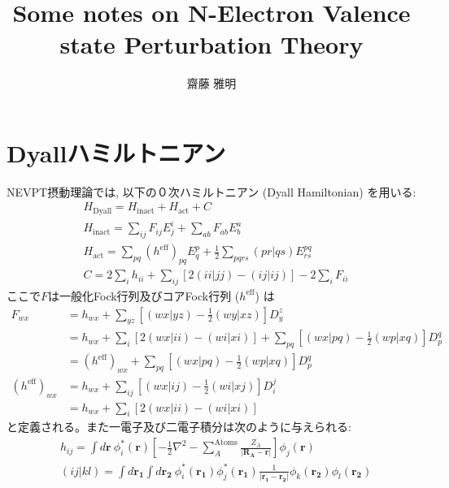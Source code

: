 \documentclass[11pt,pra,aps]{revtex4}
\begin{document}
\title{Some notes on N-Electron Valence state Perturbation Theory}
\author{齋藤 雅明}

\maketitle

\section{Dyallハミルトニアン}

NEVPT摂動理論\cite{angeliintroduction2001,angelin-electron2002,angelinew2006,angelithird-order2006}では, 以下の０次ハミルトニアン (Dyall Hamiltonian) \cite{dyallthe1995}を用いる:
%
\begin{align}
  & H_\text{Dyall} = H_\text{inact} + H_\text{act} + C \label{eq:Dyall}\\
  & H_\text{inact} = \sum_{ij} F_{ij} E^i_j + \sum_{ab} F_{ab} E^a_b \\ 
  & H_\text{act}   = \sum_{pq} (h^\text{eff})_{pq}E^p_q + \frac{1}{2}\sum_{pqrs} (pr|qs) E^{pq}_{rs} \\ 
  & C = 2\sum_i h_{ii} + \sum_{ij} [2(ii|jj)-(ij|ij)] - 2\sum_i F_{ii}\label{eq:C}
\end{align}
%
ここで$F$は一般化Fock行列及びコアFock行列 ($h^\text{eff}$) は
\begin{align}
  F_{wx} &= h_{wx} + \sum_{yz} \left[ (wx|yz) - \frac{1}{2}(wy|xz)\right] D_y^z \nonumber \\
         &= h_{wx} + \sum_{i} \left[2(wx|ii) - (wi|xi)\right] + \sum_{pq} \left[(wx|pq)-\frac{1}{2}(wp|xq)\right] D_p^q \nonumber \\
         &= (h^\text{eff})_{wx} + \sum_{pq} \left[(wx|pq)-\frac{1}{2}(wp|xq)\right] D_p^q \label{eq:genFock} \\
  (h^\text{eff})_{wx} &= h_{wx} + \sum_{ij} \left[ (wx|ij) - \frac{1}{2}(wi|xj)\right] D_i^j \nonumber \\
                      &= h_{wx} + \sum_{i} \left[2(wx|ii) - (wi|xi)\right] \label{eq:heff}
\end{align}
と定義される。また一電子及び二電子積分は次のように与えられる:
%
\begin{align}
  & h_{ij} = \int d\mathbf{r} \ \phi^{*}_i (\mathbf{r})\left[-\frac{1}{2}\nabla^{2}-\sum_A^\text{Atoms} \frac{Z_A}{|\mathbf{R_A}-\mathbf{r}|}\right]\phi_j(\mathbf{r}) \\
  & (ij|kl) = \int d\mathbf{r_1} \int d\mathbf{r_2} \ \phi^{*}_i (\mathbf{r_1}) \phi^{*}_j (\mathbf{r_1}) \frac{1}{|\mathbf{r_1}-\mathbf{r_2}|} \phi_k(\mathbf{r_2}) \phi_l(\mathbf{r_2}) \\
\end{align}
\end{document}
